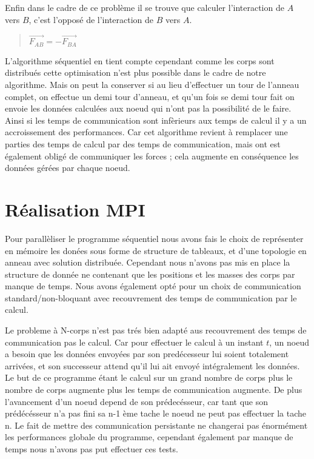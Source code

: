 \par Enfin dans le cadre de ce problème il se trouve que calculer l'interaction de $A$
vers $B$, c'est l'opposé de l'interaction de $B$ vers $A$.

\begin{quote}
  \begin{center}
    $ \overrightarrow{F_{AB}} = -\overrightarrow{F_{BA}} $
  \end{center}
\end{quote}

\par L'algorithme séquentiel en tient compte cependant comme les corps sont distribués
cette optimisation n'est plus possible dans le cadre de notre algorithme.
Mais on peut la conserver si au lieu d'effectuer un tour de l'anneau complet, on effectue
un demi tour d'anneau, et qu'un fois se demi tour fait on envoie les données calculées 
aux noeud qui n'ont pas la possibilité de le faire. Ainsi si les temps de communication
sont infèrieurs aux temps de calcul il y a un accroissement des performances. Car 
cet algorithme revient à remplacer une parties des temps de calcul par des temps de communication, 
mais ont est également obligé de communiquer les forces ; cela augmente en conséquence 
les données gérées par chaque noeud.\\

\section{Réalisation MPI}

\par Pour parallèliser le programme séquentiel nous avons fais le choix de représenter
en mémoire les donées sous forme de structure de tableaux, et d'une topologie en anneau avec
solution distribuée.
Cependant nous n'avons pas mis en place la structure de donnée ne contenant que les 
positions et les masses des corps par manque de temps. Nous avons également opté pour un 
choix de communication standard/non-bloquant avec recouvrement des temps de
communication par le calcul.\\

\par Le probleme à N-corps n'est pas trés bien adapté aus recouvrement des temps de 
communication pas le calcul. Car pour effectuer le calcul à un instant $t$, un noeud a 
besoin que les données envoyées par son predécesseur lui soient totalement arrivées, 
et son successeur attend qu'il lui ait envoyé intégralement les données. Le but de ce programme 
étant le calcul sur un grand nombre de corps plus le nombre de corps augmente plus les temps de 
communication augmente. De plus l'avancement d'un noeud depend de son prédecésseur, car tant que 
son prédécésseur n'a pas fini sa n-1 ème tache le noeud ne peut pas effectuer la tache n.
Le fait de mettre des communication persistante ne changerai pas énormément les performances
globale du programme, cependant également par manque de temps nous n'avons pas put effectuer 
ces tests.\\

